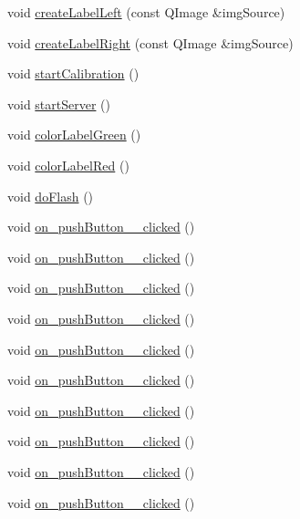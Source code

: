 \begin{DoxyCompactItemize}
\item 
void \hyperlink{class_navar_q_t_a7f799a993f8d49a3fa6fce6a6c135a93}{create\+Label\+Left} (const Q\+Image \&img\+Source)
\item 
void \hyperlink{class_navar_q_t_a83e8f4a43dd2f68211e7cc98288871ba}{create\+Label\+Right} (const Q\+Image \&img\+Source)
\item 
void \hyperlink{class_navar_q_t_a57c443ce462d7197270723af949db1ae}{start\+Calibration} ()
\item 
void \hyperlink{class_navar_q_t_a14efead4ef08a35f964ae492a6f44fff}{start\+Server} ()
\item 
void \hyperlink{class_navar_q_t_abbd46683ba8e1eb5332f6d0bdf3267ca}{color\+Label\+Green} ()
\item 
void \hyperlink{class_navar_q_t_acaf2fc30199555904840a65e431e3f5a}{color\+Label\+Red} ()
\item 
void \hyperlink{class_navar_q_t_a275c4ff527e4788362338b632cf682ea}{do\+Flash} ()
\item 
void \hyperlink{class_navar_q_t_ae671c9a7db680ac6770f7d86c6854776}{on\+\_\+push\+Button\+\_\+\_\+clicked} ()
\item 
void \hyperlink{class_navar_q_t_ac2f9730b97ead61c3cf37e8320ca0342}{on\+\_\+push\+Button\+\_\+\_\+clicked} ()
\item 
void \hyperlink{class_navar_q_t_a977bf47e535b6c0acedeac1437e0fba7}{on\+\_\+push\+Button\+\_\+\_\+clicked} ()
\item 
void \hyperlink{class_navar_q_t_ab91fa0636ab3a585a2bf7422e4f2b5d8}{on\+\_\+push\+Button\+\_\+\_\+clicked} ()
\item 
void \hyperlink{class_navar_q_t_a1e10f125024be99c20d90e36949b9269}{on\+\_\+push\+Button\+\_\+\_\+clicked} ()
\item 
void \hyperlink{class_navar_q_t_a99198b6fbaa784379dcaa68e2448359d}{on\+\_\+push\+Button\+\_\+\_\+clicked} ()
\item 
void \hyperlink{class_navar_q_t_a3486dd54514c0c5cc5b618f29f233795}{on\+\_\+push\+Button\+\_\+\_\+clicked} ()
\item 
void \hyperlink{class_navar_q_t_a13c92a1f5bc243854fcbb4670e898e30}{on\+\_\+push\+Button\+\_\+\_\+clicked} ()
\item 
void \hyperlink{class_navar_q_t_ac9c2e8d4b9be1a96a292576090fd8350}{on\+\_\+push\+Button\+\_\+\_\+clicked} ()
\item 
void \hyperlink{class_navar_q_t_a80e48ff9d9ac6b7eaccb1d348ed51a94}{on\+\_\+push\+Button\+\_\+\_\+clicked} ()

\end{DoxyCompactItemize}
